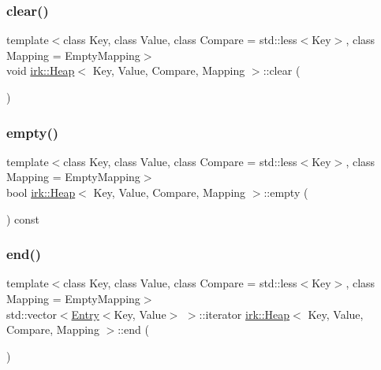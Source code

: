 \mbox{\label{classirk_1_1Heap_a20592a73ac29a73743196a7458600f47}} 
\subsubsection{\texorpdfstring{clear()}{clear()}}
{\footnotesize\ttfamily template$<$class Key, class Value, class Compare = std\+::less$<$\+Key$>$, class Mapping = Empty\+Mapping$>$ \\
void \mbox{\hyperlink{classirk_1_1Heap}{irk\+::\+Heap}}$<$ Key, Value, Compare, Mapping $>$\+::clear (\begin{DoxyParamCaption}{ }\end{DoxyParamCaption})\hspace{0.3cm}{\ttfamily [inline]}}

\mbox{\label{classirk_1_1Heap_a6f7cb66b2e9eea341877b8b42a2b7b38}} 
\subsubsection{\texorpdfstring{empty()}{empty()}}
{\footnotesize\ttfamily template$<$class Key, class Value, class Compare = std\+::less$<$\+Key$>$, class Mapping = Empty\+Mapping$>$ \\
bool \mbox{\hyperlink{classirk_1_1Heap}{irk\+::\+Heap}}$<$ Key, Value, Compare, Mapping $>$\+::empty (\begin{DoxyParamCaption}{ }\end{DoxyParamCaption}) const\hspace{0.3cm}{\ttfamily [inline]}}

\mbox{\label{classirk_1_1Heap_af663889a1e5ba217970a850b5a9f21ff}} 
\subsubsection{\texorpdfstring{end()}{end()}}
{\footnotesize\ttfamily template$<$class Key, class Value, class Compare = std\+::less$<$\+Key$>$, class Mapping = Empty\+Mapping$>$ \\
std\+::vector$<$\mbox{\hyperlink{structirk_1_1Entry}{Entry}}$<$Key, Value$>$ $>$\+::iterator \mbox{\hyperlink{classirk_1_1Heap}{irk\+::\+Heap}}$<$ Key, Value, Compare, Mapping $>$\+::end (\begin{DoxyParamCaption}{ }\end{DoxyParamCaption})\hspace{0.3cm}{\ttfamily [inline]}}

